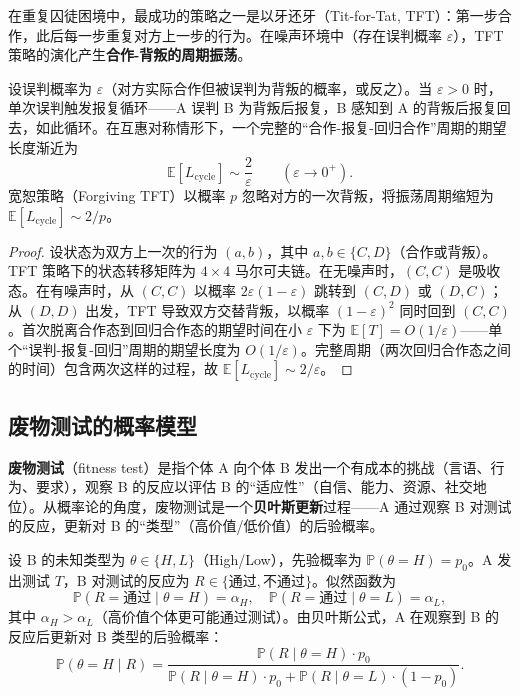 \begin{proposition}[以牙还牙策略的周期分析]\label{prop:tit_for_tat_period}
在重复囚徒困境中，最成功的策略之一是以牙还牙（Tit-for-Tat, TFT）：第一步合作，此后每一步重复对方上一步的行为。在噪声环境中（存在误判概率 $\varepsilon$），TFT 策略的演化产生\textbf{合作-背叛的周期振荡}。

设误判概率为 $\varepsilon$（对方实际合作但被误判为背叛的概率，或反之）。当 $\varepsilon > 0$ 时，单次误判触发报复循环——A 误判 B 为背叛后报复，B 感知到 A 的背叛后报复回去，如此循环。在互惠对称情形下，一个完整的“合作-报复-回归合作”周期的期望长度渐近为
\[
\mathbb{E}[L_{\text{cycle}}] \sim \frac{2}{\varepsilon} \qquad (\varepsilon \to 0^+).
\]
宽恕策略（Forgiving TFT）以概率 $p$ 忽略对方的一次背叛，将振荡周期缩短为 $\mathbb{E}[L_{\text{cycle}}] \sim 2/p$。
\end{proposition}

\begin{proof}
设状态为双方上一次的行为 $(a, b)$，其中 $a, b \in \{C, D\}$（合作或背叛）。TFT 策略下的状态转移矩阵为 $4 \times 4$ 马尔可夫链。在无噪声时，$(C, C)$ 是吸收态。在有噪声时，从 $(C, C)$ 以概率 $2\varepsilon(1-\varepsilon)$ 跳转到 $(C, D)$ 或 $(D, C)$；从 $(D, D)$ 出发，TFT 导致双方交替背叛，以概率 $(1-\varepsilon)^2$ 同时回到 $(C, C)$。首次脱离合作态到回归合作态的期望时间在小 $\varepsilon$ 下为 $\mathbb{E}[T] = O(1/\varepsilon)$——单个“误判-报复-回归”周期的期望长度为 $O(1/\varepsilon)$。完整周期（两次回归合作态之间的时间）包含两次这样的过程，故 $\mathbb{E}[L_{\text{cycle}}] \sim 2/\varepsilon$。
\end{proof}

\subsection{废物测试的概率模型}

\begin{definition}[废物测试的数学定义]\label{def:shittest}
\textbf{废物测试}（fitness test）是指个体 A 向个体 B 发出一个有成本的挑战（言语、行为、要求），观察 B 的反应以评估 B 的“适应性”（自信、能力、资源、社交地位）。从概率论的角度，废物测试是一个\textbf{贝叶斯更新}过程——A 通过观察 B 对测试的反应，更新对 B 的“类型”（高价值/低价值）的后验概率。

设 B 的未知类型为 $\theta \in \{H, L\}$（High/Low），先验概率为 $\mathbb{P}(\theta = H) = p_0$。A 发出测试 $T$，B 对测试的反应为 $R \in \{\text{通过}, \text{不通过}\}$。似然函数为
\[
\mathbb{P}(R = \text{通过} \mid \theta = H) = \alpha_H, \quad \mathbb{P}(R = \text{通过} \mid \theta = L) = \alpha_L,
\]
其中 $\alpha_H > \alpha_L$（高价值个体更可能通过测试）。由贝叶斯公式，A 在观察到 B 的反应后更新对 B 类型的后验概率：
\[
\mathbb{P}(\theta = H \mid R) = \frac{\mathbb{P}(R \mid \theta = H) \cdot p_0}{\mathbb{P}(R \mid \theta = H) \cdot p_0 + \mathbb{P}(R \mid \theta = L) \cdot (1-p_0)}.
\]
\end{definition}

